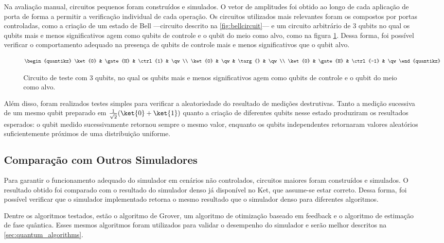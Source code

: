 Na avaliação manual, circuitos pequenos foram construídos e simulados. O vetor de amplitudes foi obtido ao longo de cada aplicação de porta de forma a permitir a verificação individual de cada operação. Os circuitos utilizados mais relevantes foram os compostos por portas controladas, como a criação de um estado de Bell ---circuito descrito na \cref{fig:bellcircuit}--- e um circuito arbitrário de 3 qubits no qual os qubits mais e menos significativos agem como qubits de controle e o qubit do meio como alvo, como na figura \cref{fig:3qubittestcircuit}. Dessa forma, foi possível verificar o comportamento adequado na presença de qubits de controle mais e menos significativos que o qubit alvo.

\begin{figure}[ht]
  \[
    \begin{quantikz}
      \ket{0} & \gate{H} & \ctrl{1} & \qw \\
      \ket{0} & \qw      & \targ{}  & \qw \\
      \ket{0} & \gate{H} & \ctrl{-1} & \qw
    \end{quantikz}
  \]
  \caption{Circuito de teste com 3 qubits, no qual os qubits mais e menos significativos agem como qubits de controle e o qubit do meio como alvo.}
  \label{fig:3qubittestcircuit}
\end{figure}

Além disso, foram realizados testes simples para verificar a aleatoriedade do resultado de medições destrutivas. Tanto a medição sucessiva de um mesmo qubit preparado em $\frac{1}{\sqrt{2}}(\ket{0} + \ket{1})$ quanto a criação de diferentes qubits nesse estado produziram os resultados esperados: o qubit medido sucessivamente retornou sempre o mesmo valor, enquanto os qubits independentes retornaram valores aleatórios suficientemente próximos de uma distribuição uniforme.

\subsection{Comparação com Outros Simuladores}

Para garantir o funcionamento adequado do simulador em cenários não controlados, circuitos maiores foram construídos e simulados. O resultado obtido foi comparado com o resultado do simulador denso já disponível no Ket, que assume-se estar correto. Dessa forma, foi possível verificar que o simulador implementado retorna o mesmo resultado que o simulador denso para diferentes algoritmos.

Dentre os algoritmos testados, estão o algoritmo de Grover, um algoritmo de otimização baseado em feedback e o algoritmo de estimação de fase quântica. Esses mesmos algoritmos foram utilizados para validar o desempenho do simulador e serão melhor descritos na \cref{sec:quantum_algorithms}.
